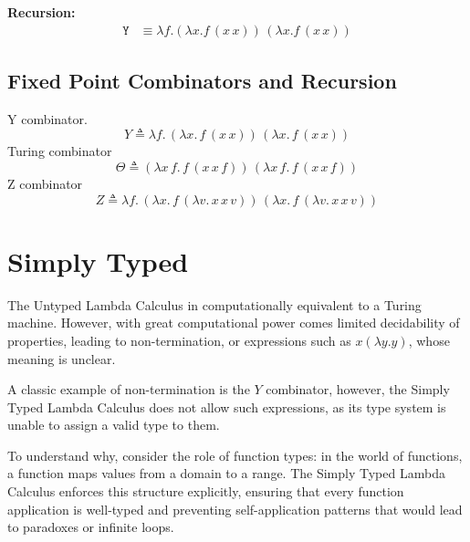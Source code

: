 \documentclass[12pt]{book}
\begin{document}
\newpage
{}

\newpage

\textbf{Recursion:}
\begin{align*}
  \texttt{Y} &\equiv \lambda f.(\lambda x. f\,(x\,x))\,(\lambda x. f\,(x\,x))
\end{align*}
\subsection{\centering Fixed Point Combinators and Recursion}
Y combinator.
\[
  Y \triangleq \lambda f.\, (\lambda x.\, f\, (x\, x))\, (\lambda x.\, f\, (x\, x))
\]
Turing combinator
\[
  \Theta \triangleq 
  (\lambda x\, f.\, f\, (x\, x\, f))\, (\lambda x\, f.\, f\, (x\, x\, f))
\]
Z combinator
\[
  Z \triangleq \lambda f.\, 
  (\lambda x.\, f\, (\lambda v.\, x\, x\, v))\, 
  (\lambda x.\, f\, (\lambda v.\, x\, x\, v))
\]
\section{\centering Simply Typed \lCalc}

The Untyped Lambda Calculus in computationally equivalent to a  Turing machine. However, with great computational power comes limited decidability of properties, leading to non-termination, or expressions such as $x(\lambda y . y)$, whose meaning is unclear.

A classic example of non-termination is the $Y$ combinator, however, the Simply Typed Lambda Calculus does not allow such expressions, as its type system is unable to assign a valid type to them.


To understand why, consider the role of function types: in the world of functions, a function maps values from a domain to a range. The Simply Typed Lambda Calculus enforces this structure explicitly, ensuring that every function application is well-typed and preventing self-application patterns that would lead to paradoxes or infinite loops.
\end{document}
